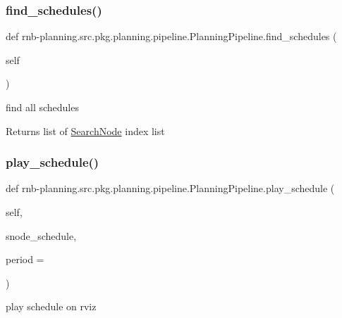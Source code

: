 \subsubsection{\texorpdfstring{find\+\_\+schedules()}{find\_schedules()}}
{\footnotesize\ttfamily def rnb-\/planning.\+src.\+pkg.\+planning.\+pipeline.\+Planning\+Pipeline.\+find\+\_\+schedules (\begin{DoxyParamCaption}\item[{}]{self }\end{DoxyParamCaption})}



find all schedules 

\begin{DoxyReturn}{Returns}
list of \hyperlink{classrnb-planning_1_1src_1_1pkg_1_1planning_1_1pipeline_1_1_search_node}{Search\+Node} index list 
\end{DoxyReturn}
\mbox{\label{classrnb-planning_1_1src_1_1pkg_1_1planning_1_1pipeline_1_1_planning_pipeline_a4e429a2c0b8fb38fa85fc1fdeef8be7c}} 
\subsubsection{\texorpdfstring{play\+\_\+schedule()}{play\_schedule()}}
{\footnotesize\ttfamily def rnb-\/planning.\+src.\+pkg.\+planning.\+pipeline.\+Planning\+Pipeline.\+play\+\_\+schedule (\begin{DoxyParamCaption}\item[{}]{self,  }\item[{}]{snode\+\_\+schedule,  }\item[{}]{period = {} }\end{DoxyParamCaption})}



play schedule on rviz 


